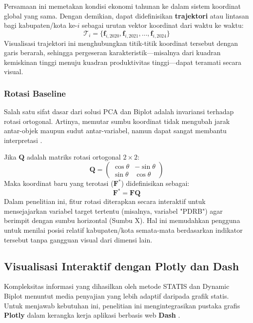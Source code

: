 \documentclass[a4paper]{article}
\theoremstyle{definition} %
\begin{document}
Persamaan ini memetakan kondisi ekonomi tahunan ke dalam sistem koordinat global yang sama. Dengan demikian, dapat didefinisikan \textbf{trajektori} atau lintasan bagi kabupaten/kota ke-$i$ sebagai urutan vektor koordinat dari waktu ke waktu:
\begin{equation}
	\mathcal{T}_i = \{ \mathbf{f}_{i,2020}, \mathbf{f}_{i,2021}, \dots, \mathbf{f}_{i,2024} \}
\end{equation}
Visualisasi trajektori ini menghubungkan titik-titik koordinat tersebut dengan garis berarah, sehingga pergeseran karakteristik—misalnya dari kuadran kemiskinan tinggi menuju kuadran produktivitas tinggi—dapat teramati secara visual.

\subsubsection{Rotasi Baseline}

Salah satu sifat dasar dari solusi PCA dan Biplot adalah invariansi terhadap rotasi ortogonal. Artinya, memutar sumbu koordinat tidak mengubah jarak antar-objek maupun sudut antar-variabel, namun dapat sangat membantu interpretasi \citep{kroonenberg2008}.

Jika $\mathbf{Q}$ adalah matriks rotasi ortogonal $2 \times 2$:
\begin{equation}
    \mathbf{Q} = \begin{pmatrix} \cos \theta & -\sin \theta \\ \sin \theta & \cos \theta \end{pmatrix}
\end{equation}
Maka koordinat baru yang terotasi ($\mathbf{F}^*$) didefinisikan sebagai:
\begin{equation}
    \mathbf{F}^* = \mathbf{F} \mathbf{Q}
\end{equation}
Dalam penelitian ini, fitur rotasi diterapkan secara interaktif untuk mensejajarkan variabel target tertentu (misalnya, variabel "PDRB") agar berimpit dengan sumbu horizontal (Sumbu X). Hal ini memudahkan pengguna untuk menilai posisi relatif kabupaten/kota semata-mata berdasarkan indikator tersebut tanpa gangguan visual dari dimensi lain.

\subsection{Visualisasi Interaktif dengan Plotly dan Dash}

Kompleksitas informasi yang dihasilkan oleh metode STATIS dan Dynamic Biplot menuntut media penyajian yang lebih adaptif daripada grafik statis. Untuk menjawab kebutuhan ini, penelitian ini mengintegrasikan pustaka grafis \textbf{Plotly} \citep{plotly2015} dalam kerangka kerja aplikasi berbasis web \textbf{Dash} \citep{dash_docs}.
\end{document}
